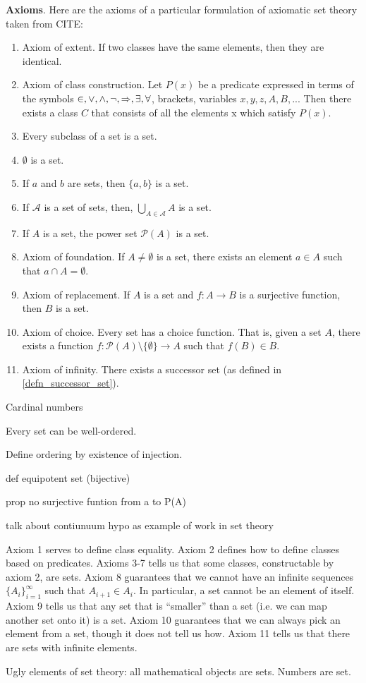 \documentclass{article}
\begin{document}
\textbf{Axioms}. Here are the axioms of a particular formulation of axiomatic set theory taken from CITE:
\begin{enumerate}
	\item Axiom of extent. If two classes have the same elements, then they are identical.
	\item Axiom of class construction. Let $P(x)$ be a predicate expressed in terms of the symbols $\in, \vee, \wedge, \neg, \Rightarrow, \exists, \forall$, brackets, variables $x, y, z, A, B, ...$ Then there exists a class $C$ that consists of all the elements x which satisfy $P(x)$.
	\item Every subclass of a set is a set.
	\item $\emptyset$ is a set.
	\item If $a$ and $b$ are sets, then $\{a, b\}$ is a set.
	\item If $\mathcal{A}$ is a set of sets, then, $\bigcup\limits_{A \in \mathcal{A}} A$ is a set.
	\item If $A$ is a set, the power set $\mathcal{P}(A)$ is a set.
	\item Axiom of foundation. If $A \neq \emptyset$ is a set, there exists an element $a \in A$ such that $a \cap A = \emptyset$.
	\item Axiom of replacement. If $A$ is a set and $f : A \to B$ is a surjective function, then $B$ is a set.
	\item Axiom of choice. Every set has a choice function. That is, given a set $A$, there exists a function $f : \mathcal{P}(A) \setminus \{ \emptyset \} \to A$ such that $f(B) \in B$.
	\item Axiom of infinity. There exists a successor set (as defined in \ref{defn_successor_set}).
\end{enumerate}

Cardinal numbers

\begin{prop}
	Every set can be well-ordered.
\end{prop}

Define ordering by existence of injection.

def equipotent set (bijective)

prop no surjective funtion from a to P(A)

talk about contiunuum hypo as example of work in set theory


\begin{remark}
	Axiom 1 serves to define class equality. Axiom 2 defines how to define classes based on predicates. Axioms 3-7 tells us that some classes, constructable by axiom 2, are sets. Axiom 8 guarantees that we cannot have an infinite sequences $\{ A_i \}_{i=1}^\infty$ such that $A_{i+1} \in A_i$. In particular, a set cannot be an element of itself. Axiom 9 tells us that any set that is ``smaller'' than a set (i.e. we can map another set onto it) is a set. Axiom 10 guarantees that we can always pick an element from a set, though it does not tell us how. Axiom 11 tells us that there are sets with infinite elements.
\end{remark}

Ugly elements of set theory: all mathematical objects are sets. Numbers are set.


%
%
\end{document}
